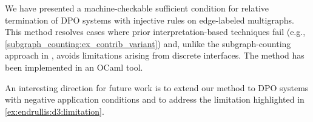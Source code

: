 We have presented a machine-checkable sufficient condition for relative termination of DPO systems with injective rules on edge-labeled multigraphs.  
This method resolves cases where prior interpretation-based techniques \cite{zantema2014termination,bruggink2014termination,bruggink2015proving,endrullis2024generalized_arxiv_v2,
overbeek2024termination_lmcs} fail (e.g., \autoref{subgraph_counting:ex_contrib_variant}) and, unlike the subgraph-counting approach in \cite{overbeek2024termination_lmcs}, avoids limitations arising from discrete interfaces.
The method has been implemented in an OCaml tool. 

An interesting direction for future work is to extend our method to DPO systems with negative application conditions and to address the limitation highlighted in \autoref{ex:endrullis:d3:limitation}.